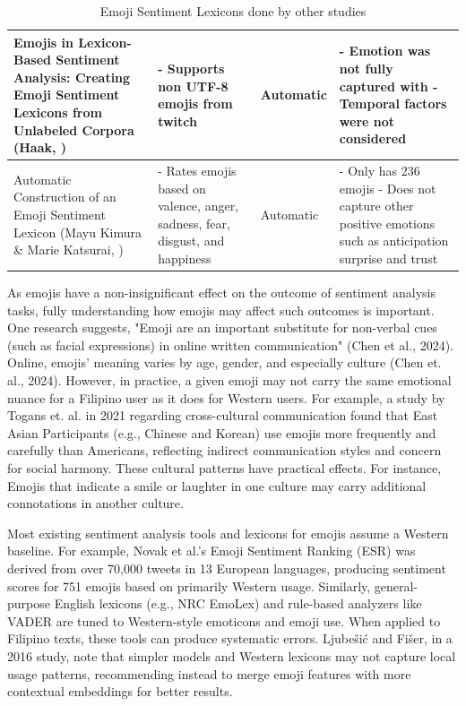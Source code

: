 \begin{table}
	\centering
	\begin{tabular}{|m{10em} | m{7em} | m{5em} | m{7em} |}
		\hline
		Emojis in Lexicon-Based Sentiment Analysis: Creating Emoji Sentiment Lexicons from Unlabeled Corpora (Haak, \citeyear{Haak2021}) &
		- Supports non UTF-8 emojis from twitch &
		Automatic &
		- Emotion was not fully captured with
		\newline - Temporal factors were not considered \\
		\hline
		Automatic Construction of an Emoji Sentiment Lexicon (Mayu Kimura \& Marie Katsurai, \citeyear{Kimura_Katsurai2017}) &
		- Rates emojis based on valence, anger, sadness, fear, disgust, and happiness &
		Automatic &
		- Only has 236 emojis 
		\newline - Does not capture other positive emotions such as anticipation surprise and trust \\
		\hline
	\end{tabular}
	\caption{Emoji Sentiment Lexicons done by other studies}
\end{table}

As emojis have a non-insignificant effect on the outcome of sentiment analysis tasks, fully understanding how emojis may affect such outcomes is important. One research suggests, "Emoji are an important substitute for non-verbal cues (such as facial expressions) in online written communication" (Chen et al., 2024). Online, emojis' meaning varies by age, gender, and especially culture (Chen et. al., 2024). However, in practice, a given emoji may not carry the same emotional nuance for a Filipino user as it does for Western users. For example, a study by Togans et. al. in 2021 regarding cross-cultural communication found that East Asian Participants (e.g., Chinese and Korean) use emojis more frequently and carefully than Americans, reflecting indirect communication styles and concern for social harmony. These cultural patterns have practical effects. For instance, Emojis that indicate a smile or laughter in one culture may carry additional connotations in another culture.

Most existing sentiment analysis tools and lexicons for emojis assume a Western baseline. For example, Novak et al.'s Emoji Sentiment Ranking (ESR) was derived from over 70,000 tweets in 13 European languages, producing sentiment scores for 751 emojis based on primarily Western usage. Similarly, general-purpose English lexicons (e.g., NRC EmoLex) and rule-based analyzers like VADER are tuned to Western-style emoticons and emoji use. When applied to Filipino texts, these tools can produce systematic errors. Ljubešić and Fišer, in a 2016 study, note that simpler models and Western lexicons may not capture local usage patterns, recommending instead to merge emoji features with more contextual embeddings for better results.

